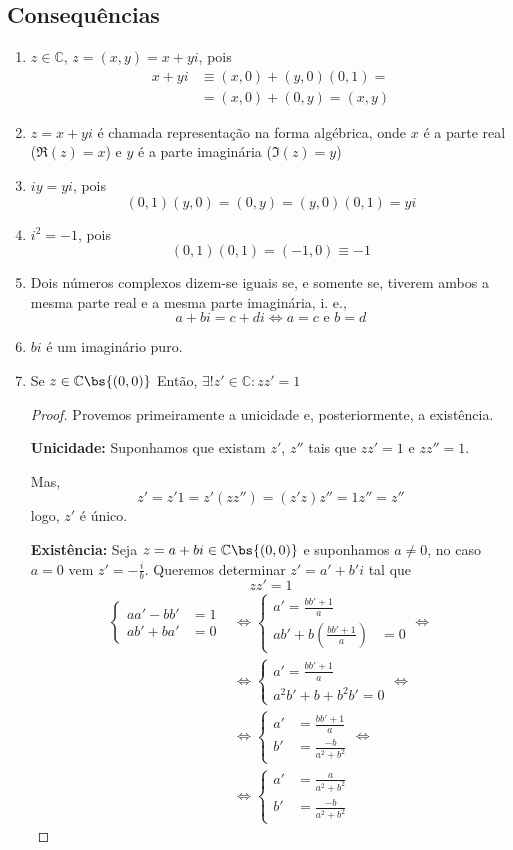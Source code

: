 \documentclass[12pt, oneside, a4paper, english, brazil]{abntex2}
\newcommand{\C}{\mathbb{C}}
\theoremstyle{normal}
\theoremstyle{observacao}
\begin{document}
\subsection*{Consequências}
\begin{enumerate}
\item $z \in \C$, $z=(x,y)=x+yi$, pois
\begin{align*}
x+yi &\equiv (x,0)+(y,0)(0,1) = \\
&= (x,0)+(0,y)=(x,y)
\end{align*}
\item $z=x+yi$ é chamada representação na forma algébrica, onde $x$ é a parte real ($\mathfrak{R}(z)=x$) e $y$ é a parte imaginária ($\mathfrak{I}(z)=y$)
\item $iy = yi$, pois
\[
(0,1)(y,0) = (0,y) = (y,0)(0,1) = yi
\]
\item $i^2 = -1$, pois
\[
(0,1)(0,1)=(-1,0) \equiv -1
\]
\item Dois números complexos dizem-se iguais se, e somente se, tiverem ambos a mesma parte real e a mesma parte imaginária, i. e.,
\[
a+bi=c+di \Leftrightarrow a = c \text{ e } b=d
\]
\item $bi$ é um imaginário puro.
\item Se $z \in \C\bs \{(0,0)\}$ Então, $\exists ! z' \in \C : zz' = 1$
\begin{proof}
Provemos primeiramente a unicidade e, posteriormente, a existência.

\textbf{Unicidade:} Suponhamos que existam $z'$, $z''$ tais que $zz' = 1$ e $zz'' = 1$.

Mas,
\[
z' = z'1 = z'(zz'') = (z'z)z''=1z''=z''
\]
logo, $z'$ é único.

\textbf{Existência:} Seja $z=a+bi \in \C\bs\{(0,0)\}$ e suponhamos $a \neq 0$, no caso $a=0$ vem $z' = - \frac{i}{b}$. Queremos determinar $z'=a'+b'i$ tal que
\[
zz'=1
\]
\begin{align*}
\left\{
\begin{array}{ll}
aa'-bb'&=1\\
ab'+ba'&=0
\end{array}
\right.
&\Leftrightarrow 
\left\{
\begin{array}{ll}
a' = \frac{bb'+1}{a} \\
ab'+b\left(\frac{bb'+1}{a} \right) &= 0
\end{array}
\right. \Leftrightarrow \\
&\Leftrightarrow 
\left\{
\begin{array}{ll}
a' = \frac{bb'+1}{a} \\
a^2b'+b+b^2b'=0
\end{array}
\right. \Leftrightarrow \\
&\Leftrightarrow 
\left\{
\begin{array}{ll}
a' &= \frac{bb'+1}{a} \\
b' &= \frac{-b}{a^2+b^2}
\end{array}
\right. \Leftrightarrow \\
&\Leftrightarrow 
\left\{
\begin{array}{ll}
a' &= \frac{a}{a^2+b^2} \\
b' &= \frac{-b}{a^2+b^2}
\end{array}
\right.
\end{align*}


\end{proof}
\end{enumerate}
\end{document}
